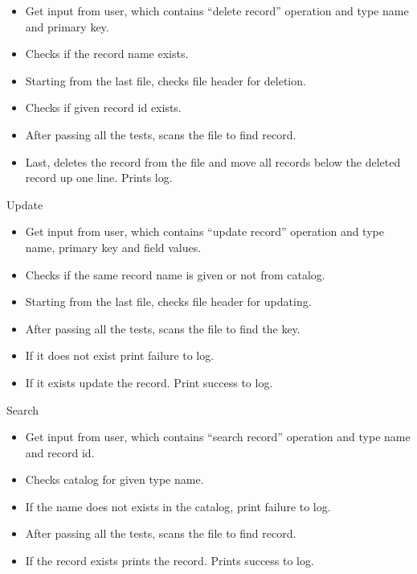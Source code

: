 \documentclass[
]{article}
\begin{document}
\begin{itemize}
\item
  Get input from user, which contains ``delete record'' operation and
  type name and primary key.
\item
    Checks if the record name exists.
\item
    Starting from the last file, checks file header for deletion.
\item
    Checks if given record id exists.
\item
    After passing all the tests, scans the file to find record.
\item
    Last, deletes the record from the file and move all records below the deleted record up one line. Prints log.

\end{itemize}

Update

\begin{itemize}
\item
  Get input from user, which contains ``update record'' operation and
  type name, primary key and field values.
\item
    Checks if the same record name is given or not from catalog.
\item
    Starting from the last file, checks file header for updating.
\item
    After passing all the tests, scans the file to find the key.
\item
    If it does not exist print failure to log.
\item
    If it exists update the record. Print success to log.
    
\end{itemize}

Search

\begin{itemize}
\item
  Get input from user, which contains ``search record'' operation and
  type name and record id.
\item
    Checks catalog for given type name.
\item
    If the name does not exists in the catalog, print failure to log.
\item
    After passing all the tests, scans the file to find record.
\item
    If the record exists prints the record. Prints success to log.
    
\end{itemize}
\end{document}
